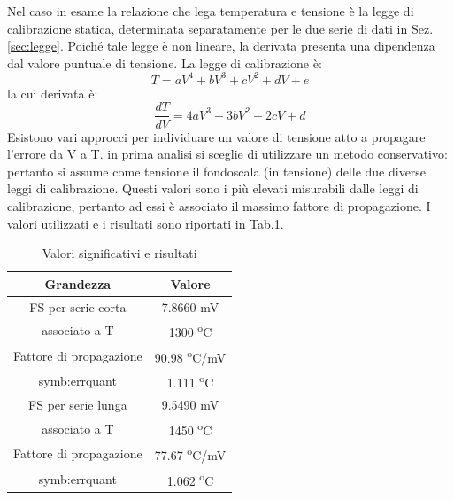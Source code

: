 Nel caso in esame la relazione che lega temperatura e tensione è la legge di calibrazione statica, determinata separatamente per le due serie di dati in Sez.\ref{sec:legge}. Poiché tale legge è non lineare, la derivata presenta una dipendenza dal valore puntuale di tensione. La legge di calibrazione è:
\begin{equation}
	T = aV^4 + bV^3+cV^2+dV+e
\end{equation}
la cui derivata è: 
\begin{equation}
	\frac{dT}{dV} = 4aV^3+3bV^2+2cV+d
\end{equation}
Esistono vari approcci per individuare un valore di tensione atto a propagare l'errore da V a T. in prima analisi si sceglie di utilizzare un metodo conservativo: pertanto si assume come tensione il fondoscala (in tensione) delle due diverse leggi di calibrazione. Questi valori sono i più elevati misurabili dalle leggi di calibrazione, pertanto ad essi è associato il massimo fattore di propagazione.
I valori utilizzati e i risultati sono riportati in Tab.\ref{tab:valorierisultati}.
\begin{table}[H]
\centering
\begin{tabular}{c|c}
	\toprule
	\toprule
	\textbf{Grandezza} & \textbf{Valore} \\
	\midrule
	FS per serie corta & 7.8660 mV\\
	associato a T & 1300 \textsuperscript{o}C\\
	\midrule
	Fattore di propagazione & 90.98 \textsuperscript{o}C/mV\\
	\midrule
	\gls{symb:errquant} & 1.111 \textsuperscript{o}C\\
	\midrule
	\midrule
	FS per serie lunga & 9.5490 mV\\
	associato a T & 1450 \textsuperscript{o}C\\
	\midrule
	Fattore di propagazione & 77.67 \textsuperscript{o}C/mV\\
	\midrule
	\gls{symb:errquant} & 1.062 \textsuperscript{o}C\\
	
	\bottomrule
	\bottomrule
\end{tabular}
\caption{Valori significativi e risultati}
\label{tab:valorierisultati}
\end{table}

